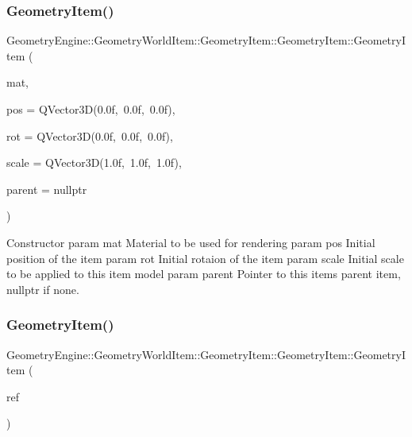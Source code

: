 \subsubsection{\texorpdfstring{GeometryItem()}{GeometryItem()}\hspace{0.1cm}{\footnotesize\ttfamily [1/2]}}
{\footnotesize\ttfamily Geometry\+Engine\+::\+Geometry\+World\+Item\+::\+Geometry\+Item\+::\+Geometry\+Item\+::\+Geometry\+Item (\begin{DoxyParamCaption}\item[{const \mbox{\hyperlink{class_geometry_engine_1_1_geometry_material_1_1_material}{Geometry\+Material\+::\+Material}} \&}]{mat,  }\item[{const Q\+Vector3D \&}]{pos = {\ttfamily QVector3D(0.0f,~0.0f,~0.0f)},  }\item[{const Q\+Vector3D \&}]{rot = {\ttfamily QVector3D(0.0f,~0.0f,~0.0f)},  }\item[{const Q\+Vector3D \&}]{scale = {\ttfamily QVector3D(1.0f,~1.0f,~1.0f)},  }\item[{\mbox{\hyperlink{class_geometry_engine_1_1_geometry_world_item_1_1_world_item}{World\+Item}} $\ast$}]{parent = {\ttfamily nullptr} }\end{DoxyParamCaption})}

Constructor param mat Material to be used for rendering param pos Initial position of the item param rot Initial rotaion of the item param scale Initial scale to be applied to this item model param parent Pointer to this items parent item, nullptr if none. \mbox{\label{class_geometry_engine_1_1_geometry_world_item_1_1_geometry_item_1_1_geometry_item_abf5badf6ed7138295b6a2b635ff1cf53}} 
\subsubsection{\texorpdfstring{GeometryItem()}{GeometryItem()}\hspace{0.1cm}{\footnotesize\ttfamily [2/2]}}
{\footnotesize\ttfamily Geometry\+Engine\+::\+Geometry\+World\+Item\+::\+Geometry\+Item\+::\+Geometry\+Item\+::\+Geometry\+Item (\begin{DoxyParamCaption}\item[{const \mbox{\hyperlink{class_geometry_engine_1_1_geometry_world_item_1_1_geometry_item_1_1_geometry_item}{Geometry\+Item}} \&}]{ref }\end{DoxyParamCaption})}

